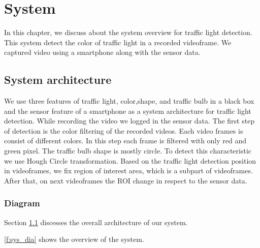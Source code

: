 \chapter{System}
\label{c:system}
In this chapter, we discuss about the system overview for traffic light detection.
This system detect the color of traffic light in a recorded videoframe.
We captured video using a smartphone along with the sensor data.

\section{System architecture}
\label{s:archi}
We use three features of traffic light, color,shape, and traffic bulb in a black box and the sensor feature of a smartphone as a system architecture for traffic light detection.
While recording the video we logged in the sensor data.
The first step of detection is the color filtering of the recorded videos.
Each video frames is consist of different colors.
In this step each frame is filtered with only red and green pixel.
The traffic bulb shape is mostly circle.
To detect this characteristic we use Hough Circle  transformation\cite{hough_circle}.
Based on the traffic light detection position in videoframes, we fix region of interest area, which is a subpart of videoframes.
After that, on next videoframes the ROI change in respect to the sensor data. 

\subsection{Diagram}

Section \ref{s:archi} discesses the overall architecture of our system.

\ref{f:sys_dia} shows the overview of the system.

